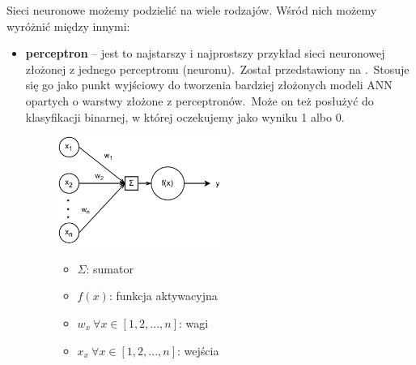 Sieci neuronowe możemy podzielić na wiele rodzajów. Wśród nich możemy wyróżnić między innymi:
\begin{itemize}
    \item \textbf{perceptron} -- jest to najstarszy i najprostszy przykład sieci neuronowej złożonej z jednego perceptronu (neuronu).\ Został przedstawiony na .\ Stosuje się go jako punkt wyjściowy do tworzenia bardziej złożonych modeli ANN opartych o warstwy złożone z perceptronów.\ Może on też posłużyć do klasyfikacji binarnej, w której oczekujemy jako wyniku 1 albo 0.
\begin{figure}[H]
    \centering
    \includegraphics[width=0.5\textwidth]{images/neuron}
    \begin{itemize}
        \item[] $\Sigma$: sumator
        \item[] $f(x)$: funkcja aktywacyjna
        \item[] $w_x \  \forall x \in [1, 2, ..., n]$: wagi
        \item[] $x_x \  \forall x \in [1, 2, ..., n]$: wejścia
    \end{itemize}
    \label{fig:neuron}
\end{figure}


\end{itemize}
